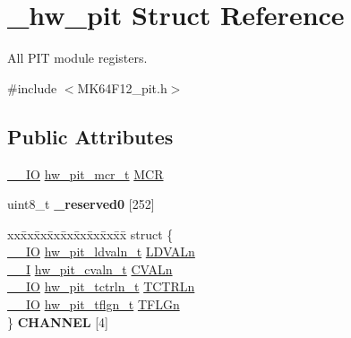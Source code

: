 \hypertarget{struct__hw__pit}{}\section{\+\_\+hw\+\_\+pit Struct Reference}
\label{struct__hw__pit}


All P\+IT module registers.  




{\ttfamily \#include $<$M\+K64\+F12\+\_\+pit.\+h$>$}

\subsection*{Public Attributes}
\begin{DoxyCompactItemize}
\item 
\hyperlink{core__sc300_8h_aec43007d9998a0a0e01faede4133d6be}{\+\_\+\+\_\+\+IO} \hyperlink{union__hw__pit__mcr}{hw\+\_\+pit\+\_\+mcr\+\_\+t} \hyperlink{struct__hw__pit_a38c7cbae6c7902108ce6d7c356b65d19}{M\+CR}
\item 
uint8\+\_\+t {\bfseries \+\_\+reserved0} \mbox{[}252\mbox{]}\hypertarget{struct__hw__pit_aa27bcac1ae689636e67272a97fc8f8a4}{}\label{struct__hw__pit_aa27bcac1ae689636e67272a97fc8f8a4}

\item 
\begin{tabbing}
xx\=xx\=xx\=xx\=xx\=xx\=xx\=xx\=xx\=\kill
struct \{\\
\>\hyperlink{core__sc300_8h_aec43007d9998a0a0e01faede4133d6be}{\_\_IO} \hyperlink{union__hw__pit__ldvaln}{hw\_pit\_ldvaln\_t} \hyperlink{struct__hw__pit_aec4b30897f0e80f660ad105f7ce33d5c}{LDVALn}\\
\>\hyperlink{core__sc300_8h_af63697ed9952cc71e1225efe205f6cd3}{\_\_I} \hyperlink{union__hw__pit__cvaln}{hw\_pit\_cvaln\_t} \hyperlink{struct__hw__pit_a9b0880684600e18e71a009df99fac13c}{CVALn}\\
\>\hyperlink{core__sc300_8h_aec43007d9998a0a0e01faede4133d6be}{\_\_IO} \hyperlink{union__hw__pit__tctrln}{hw\_pit\_tctrln\_t} \hyperlink{struct__hw__pit_ab4be36541eebdc01d57596afbe548045}{TCTRLn}\\
\>\hyperlink{core__sc300_8h_aec43007d9998a0a0e01faede4133d6be}{\_\_IO} \hyperlink{union__hw__pit__tflgn}{hw\_pit\_tflgn\_t} \hyperlink{struct__hw__pit_a5a48af1605e50720a1e5865c8c58e145}{TFLGn}\\
\} {\bfseries CHANNEL} \mbox{[}4\mbox{]}\hypertarget{struct__hw__pit_a9c18b70d46117c0ce5d4989f9b19d91b}{}\label{struct__hw__pit_a9c18b70d46117c0ce5d4989f9b19d91b}
\\

\end{tabbing}\end{DoxyCompactItemize}


